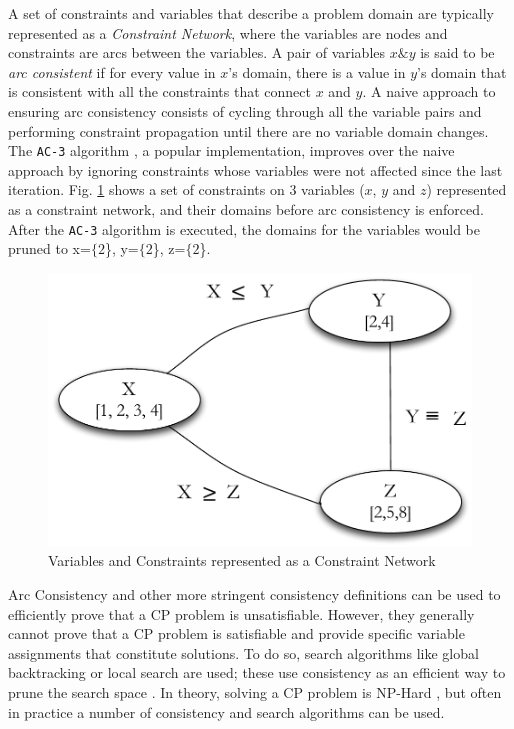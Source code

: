 {A set of constraints and variables that describe a problem domain are
typically represented as a \emph{Constraint Network}, where the
variables are nodes and constraints are arcs between the variables. A
pair of variables $x \& y$ is said to be \emph{arc consistent} if for
every value in $x$'s domain, there is a value in $y$'s domain that is
consistent with all the constraints that connect $x$ and $y$.  A naive
approach to ensuring arc consistency consists of cycling through all
the variable pairs and performing constraint propagation until there
are no variable domain changes. The \texttt{AC-3} algorithm
\cite{mackworth77}, a popular implementation, improves over the naive
approach by ignoring constraints whose variables were not affected
since the last iteration. Fig. \ref{fig:constraintnet} shows a set of
constraints on $3$ variables ($x$, $y$ and $z$) represented as a
constraint network, and their domains before arc consistency is
enforced.  After the \texttt{AC-3} algorithm is executed, the domains
for the variables would be pruned to x=$\{2$\}, y=$\{2$\}, z=$\{2$\}.

\begin{figure}[!t]
\centering
\includegraphics[scale=0.3]{figs/constraint-net.pdf}
\caption{\small Variables and Constraints represented as a Constraint Network}
\label{fig:constraintnet}
\end{figure}

Arc Consistency and other more stringent consistency definitions can
be used to efficiently prove that a \textsf{CP} problem is
unsatisfiable. However, they generally cannot prove that a \textsf{CP}
problem is satisfiable and provide specific variable assignments that
constitute solutions. To do so, search algorithms like global
backtracking \cite{hooker05} or local search are used; these use
consistency as an efficient way to prune the search space
\cite{cp06}. In theory, solving a \textsf{CP} problem is NP-Hard
\cite{ghallab04}, but often in practice a number of consistency and
search algorithms can be used.

}
